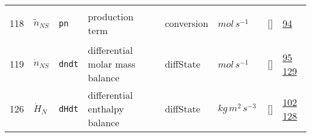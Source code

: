 \begin{longtable}{|p{1cm}|p{3cm}|p{3cm}|p{7cm}|p{3.0cm}|p{3cm}|p{2cm}|p{1cm}|}
    118
             & \hypertarget{"v:118"}{ $ {\tilde{n}}{_{{N S}}} $}
             & \verb|pn|
             & production term
             & \begin{lay}conversion \end{lay}
             & $ mol \,s^{-1} \, $
             & []
             & \hyperlink{"e:94"}{ 94 }
                 \\
    119
             & \hypertarget{"v:119"}{ $ {\dot{n}}{_{{N S}}} $}
             & \verb|dndt|
             & differential molar mass balance
             & \begin{lay}diffState \end{lay}
             & $ mol \,s^{-1} \, $
             & []
             & \hyperlink{"e:95"}{ 95 }
                 \hyperlink{"e:129"}{ 129 }
                 \\
    126
             & \hypertarget{"v:126"}{ $ {\dot{H}}{_{N}} $}
             & \verb|dHdt|
             & differential enthalpy balance
             & \begin{lay}diffState \end{lay}
             & $ kg \,m^{2} \,s^{-3} \, $
             & []
             & \hyperlink{"e:102"}{ 102 }
                 \hyperlink{"e:128"}{ 128 }
                 \\
    \end{longtable}